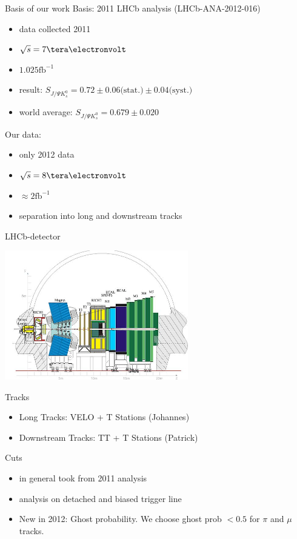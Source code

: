 \documentclass{beamer}
\newcommand{\SJPsi}{S_{J/\Psi K_s^0}}
\begin{document}
	\begin{frame}{Basis of our work}
	Basis: 2011 LHCb analysis (LHCb-ANA-2012-016)
	\begin{itemize}
	    \item data collected 2011
	    \item $\sqrt{s} = 7\tera\electronvolt$
	    \item $1.025 \mathrm{fb}^{-1}$
	    \item result: $\SJPsi = 0.72 \pm 0.06 \text{(stat.)} \pm 0.04 \text{(syst.)}$
	    \item world average: $\SJPsi = 0.679 \pm 0.020$
	\end{itemize}
	
	Our data:
	\begin{itemize}
	    \item only 2012 data
	    \item $\sqrt{s} = 8\tera\electronvolt$
	    \item $\approx 2 \mathrm{fb}^{-1}$
   	    \item separation into long and downstream tracks
	\end{itemize}
	\end{frame}
	
	\begin{frame}{LHCb-detector}
	\begin{center}
	\includegraphics[width = 0.6\textwidth]{detector}
	\end{center}
	\begin{block}{Tracks}
	\begin{itemize}
		\item Long Tracks: VELO + T Stations (Johannes)
		\item Downstream Tracks: TT + T Stations (Patrick)
	\end{itemize}
	\end{block}	
	\end{frame}
	
	
	\begin{frame}{Cuts}
    \begin{itemize}
    \item in general took from 2011 analysis
    \item analysis on detached and biased trigger line
	\item New in 2012: Ghost probability. We choose ghost prob $<0.5$ for $\pi$ and $\mu$ tracks.
	\end{itemize}
	\end{frame}
	
\end{document}
